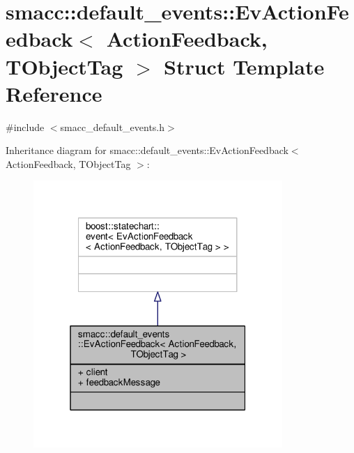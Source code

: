 \hypertarget{structsmacc_1_1default__events_1_1EvActionFeedback}{}\section{smacc\+:\+:default\+\_\+events\+:\+:Ev\+Action\+Feedback$<$ Action\+Feedback, T\+Object\+Tag $>$ Struct Template Reference}
\label{structsmacc_1_1default__events_1_1EvActionFeedback}


{\ttfamily \#include $<$smacc\+\_\+default\+\_\+events.\+h$>$}



Inheritance diagram for smacc\+:\+:default\+\_\+events\+:\+:Ev\+Action\+Feedback$<$ Action\+Feedback, T\+Object\+Tag $>$\+:\nopagebreak
\begin{figure}[H]
\begin{center}
\leavevmode
\includegraphics[width=268pt]{structsmacc_1_1default__events_1_1EvActionFeedback__inherit__graph}
\end{center}
\end{figure}


